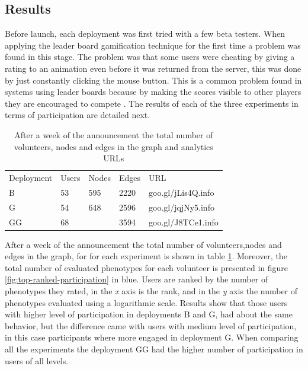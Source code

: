 \subsection{Results} 
Before launch, each deployment was first tried with a few beta testers. 
When applying the leader board gamification technique for the first time a 
problem was found in this stage. The problem was that some users were cheating by giving a
rating to an animation even before it was returned from the server, this was done by just
constantly clicking the mouse button. This is a common problem found in systems using leader
boards because by making the scores visible to other players they are encouraged 
to compete \cite{hickman2010total}. The results of each of the three experiments in 
terms of participation are detailed next.

\begin{table}
  \small
  \caption{ After a week of the announcement the total number of volunteers, 
  nodes and edges in the graph and analytics URLs}
  \label{tab:urls} 
  \centering
  \small
  \begin{tabular}{l l l l l}
    \hline\noalign{\smallskip}
     Deployment &  Users &  Nodes &  Edges & URL \\
    \noalign{\smallskip}\hline\noalign{\smallskip}
    B   & 53 &  595   & 2220  & goo.gl/jLis4Q.info \\ \hline
    G   & 54 &  648   & 2596  & goo.gl/jqjNy5.info \\ \hline
    GG  & 68 &        & 3594  & goo.gl/J8TCe1.info \\ \hline
    \end{tabular}
\end{table}

After a week of the announcement the total number of volunteers,nodes and edges 
in the graph, for for each experiment is shown in table \ref{tab:urls}.
Moreover, the total number of evaluated phenotypes for each volunteer is presented in figure 
\ref{fig:top-ranked-participation} in blue. Users are ranked by the 
number of phenotypes they rated, in the \emph{x} axis is the rank, and in the \emph{y} axis 
the number of phenotypes evaluated using a logarithmic scale. 
Results  show that those users with higher level of participation in deployments B and G, had
about the same behavior, but the difference came with users with medium level of participation,
in this case participants where more engaged in deployment G. When comparing all the experiments
the deployment GG had the higher number of participation in users of all levels.    

